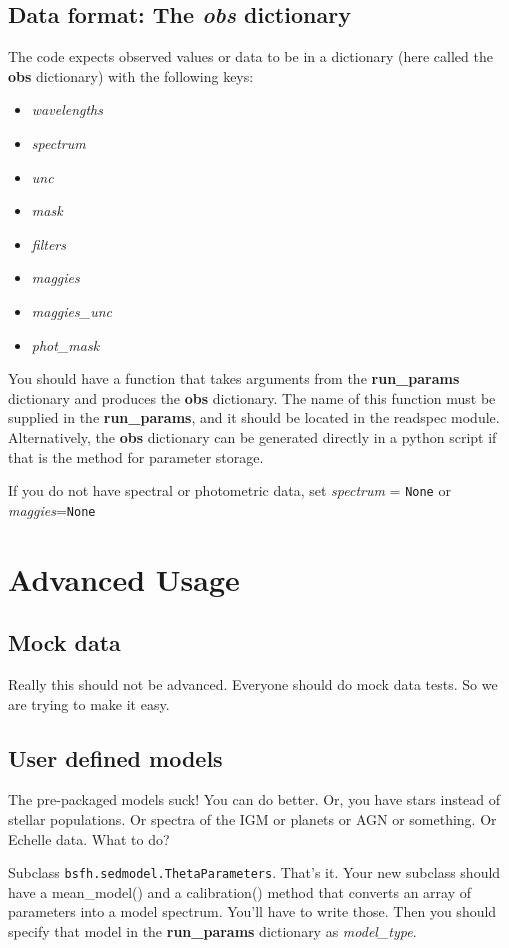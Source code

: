 \begin{itemize}
\subsection{Data format: The \emph{obs} dictionary}
The code expects observed values or data to be in a dictionary (here
called the {\bf obs} dictionary) with the following keys:
\begin{itemize}
\item {\it wavelengths}
\item {\it spectrum}
\item {\it unc}
\item {\it mask}
\item {\it filters}
\item {\it maggies}
\item {\it maggies_unc}
\item {\it phot_mask}
\end{itemize}

You should have a function that takes arguments from the {\bf
run_params} dictionary and produces the {\bf obs} dictionary.  The
name of this function must be supplied in the {\bf run_params}, and it
should be located in the readspec module. Alternatively, the {\bf obs}
dictionary can be generated directly in a python script if that is the
method for parameter storage.

If you do not have spectral or photometric data, set {\it spectrum} =
\texttt{None} or {\it maggies}=\texttt{None}

\section{Advanced Usage}

\subsection{Mock data}
Really this should not be advanced.  Everyone should do mock data
tests.  So we are trying to make it easy.

\subsection{User defined models}
The pre-packaged models suck!  You can do better.  Or, you have stars
instead of stellar populations.  Or spectra of the IGM or planets or
AGN or something. Or Echelle data. What to do?

Subclass \texttt{bsfh.sedmodel.ThetaParameters}.  That's it.  Your new
subclass should have a mean_model() and a calibration() method that
converts an array of parameters into a model spectrum.  You'll have to
write those.  Then you should specify that model in the {\bf
run_params} dictionary as {\it model_type}.


\end{itemize}
